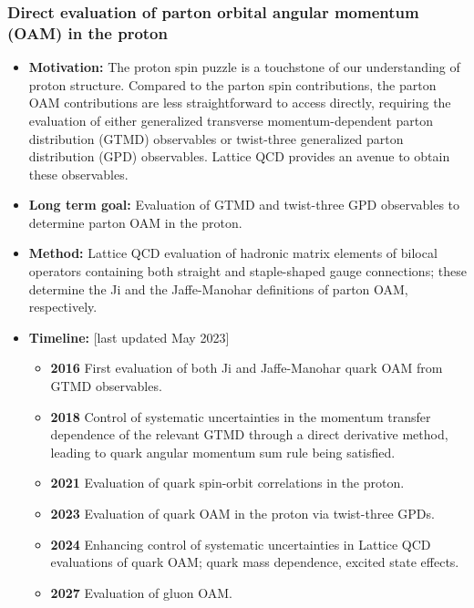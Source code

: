\documentclass[12pt,hyperpdf]{article}
\begin{document}
\subsubsection{Direct evaluation of parton orbital angular momentum (OAM) in
the proton}
\begin{itemize}
\item{\bf Motivation:} The proton spin puzzle is a touchstone of our
understanding of proton structure. Compared to the parton spin
contributions, the parton OAM contributions are less straightforward
to access directly, requiring the evaluation of either generalized
transverse momentum-dependent parton distribution (GTMD) observables
or twist-three generalized parton distribution (GPD) observables.
Lattice QCD provides an avenue to obtain these observables.
\item{\bf Long term goal:} Evaluation of GTMD and twist-three GPD observables
to determine parton OAM in the proton.
\item{\bf Method:} Lattice QCD evaluation of hadronic matrix elements of
bilocal operators containing both straight and staple-shaped gauge
connections; these determine the Ji and the Jaffe-Manohar definitions
of parton OAM, respectively.
\item{\bf Timeline:} \hfill [last updated May 2023]
\begin{itemize}
\item{\bf 2016} First evaluation of both Ji and Jaffe-Manohar quark OAM from
GTMD observables.
\item{\bf 2018} Control of systematic uncertainties in the momentum transfer
dependence of the relevant GTMD through a direct derivative method,
leading to quark angular momentum sum rule being satisfied.
\item{\bf 2021} Evaluation of quark spin-orbit correlations in the proton.
\item{\bf 2023} Evaluation of quark OAM in the proton via twist-three GPDs.
\item{\bf 2024} Enhancing control of systematic uncertainties in Lattice QCD
evaluations of quark OAM; quark mass dependence, excited state effects.
\item{\bf 2027} Evaluation of gluon OAM.
\end{itemize}
\end{itemize}


\end{document}
